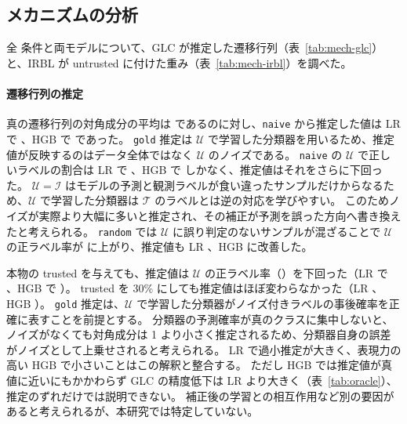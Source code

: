 \documentclass[a4paper,10pt]{ltjsarticle}
\newcommand{\method}[1]{\texttt{#1}}
\begin{document}
\begin{table}[tbp]
  \centering
  \caption{本物の trusted を与えた場合の $\Delta$（pt）のデータセット・ノイズ別の内訳（2 ノイズ率 $\times$ 5 シードの平均）。sym = symmetric、inst = instance。}
  \label{tab:oracle-breakdown}
  \scriptsize
  \setlength{\tabcolsep}{3.5pt}
  
\end{table}

\subsection{メカニズムの分析}\label{sec:mech}
全 \NCond{} 条件と両モデルについて、GLC が推定した遷移行列（表~\ref{tab:mech-glc}）と、IRBL が untrusted に付けた重み（表~\ref{tab:mech-irbl}）を調べた。

\paragraph{遷移行列の推定}
真の遷移行列の対角成分の平均は \MechLRTrueDiag{} であるのに対し、\method{naive} から推定した値は LR で \MechLRNaiveDiag{}、HGB で \MechHGBNaiveDiag{} であった。
\texttt{gold} 推定は $\mathcal{U}$ で学習した分類器を用いるため、推定値が反映するのはデータ全体ではなく $\mathcal{U}$ のノイズである。
\method{naive} の $\mathcal{U}$ で正しいラベルの割合は LR で \MechLRNaiveUClean{}、HGB で \MechHGBNaiveUClean{} しかなく、推定値はそれをさらに下回った。
$\mathcal{U} = \mathcal{I}$ はモデルの予測と観測ラベルが食い違ったサンプルだけからなるため、$\mathcal{U}$ で学習した分類器は $\mathcal{T}$ のラベルとは逆の対応を学びやすい。
このためノイズが実際より大幅に多いと推定され、その補正が予測を誤った方向へ書き換えたと考えられる。
\method{random} では $\mathcal{U}$ に誤り判定のないサンプルが混ざることで $\mathcal{U}$ の正ラベル率が \MechLRRandomUClean{} に上がり、推定値も LR \MechLRRandomDiag{}、HGB \MechHGBRandomDiag{} に改善した。

本物の trusted を与えても、推定値は $\mathcal{U}$ の正ラベル率（\MechLROracleTenUClean{}）を下回った（LR で \MechLROracleTenDiag{}、HGB で \MechHGBOracleTenDiag{}）。
trusted を 30\% にしても推定値はほぼ変わらなかった（LR \MechLROracleThirtyDiag{}、HGB \MechHGBOracleThirtyDiag{}）。
\texttt{gold} 推定は、$\mathcal{U}$ で学習した分類器がノイズ付きラベルの事後確率を正確に表すことを前提とする。
分類器の予測確率が真のクラスに集中しないと、ノイズがなくても対角成分は 1 より小さく推定されるため、分類器自身の誤差がノイズとして上乗せされると考えられる。
LR で過小推定が大きく、表現力の高い HGB で小さいことはこの解釈と整合する。
ただし HGB では推定値が真値に近いにもかかわらず GLC の精度低下は LR より大きく（表~\ref{tab:oracle}）、推定のずれだけでは説明できない。
補正後の学習との相互作用など別の要因があると考えられるが、本研究では特定していない。
\end{document}
